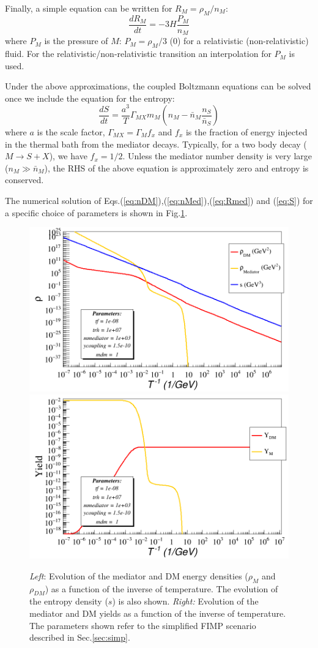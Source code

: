 \documentclass{article}
\def\to{\rightarrow}
\def\be{\begin{equation}}
\def\ee{\end{equation}}
\def\to{\rightarrow}
\newcommand\Drv[2]{\frac{d #1}{d #2}}
\begin{document}
Finally, a simple equation can be written for $R_M = \rho_M/n_M$:
\be
\Drv{R_M}{t} = -3 H \frac{P_M}{n_M} \label{eq:Rmed}
\ee
where $P_M$ is the pressure of $M$: $P_M = \rho_M/3$ ($0$) for a relativistic (non-relativistic) fluid.
For the relativistic/non-relativistic transition an interpolation for $P_M$ is
used.

Under the above approximations, the coupled Boltzmann equations can be solved once we include
the equation for the entropy:
\be
\Drv{S}{t} = \frac{a^3}{T} \Gamma_{MX} m_M \left(n_M -\bar{n}_M \frac{n_S}{\bar{n}_S}\right) \label{eq:S}
\ee
where $a$ is the scale factor, $\Gamma_{MX} = \Gamma_M f_x$ and $f_x$ is the fraction
of energy injected in the thermal bath from the mediator decays. Typically,
for a two body decay ($M \to S + X$), we have $f_x = 1/2$.
Unless the mediator number density is very large ($n_M \gg \bar{n}_M$), the RHS of the above equation is approximately
zero and entropy is conserved.

The numerical solution of Eqs.(\ref{eq:nDM}),(\ref{eq:nMed}),(\ref{eq:Rmed}) and (\ref{eq:S})
for a specific choice of parameters is shown in Fig.\ref{fig:solution1}.

\begin{figure}
\includegraphics[width=0.5\linewidth,clip]{test.png}
\includegraphics[width=0.5\linewidth,clip]{yield.png}
\caption{{\it Left}: Evolution of the mediator and DM energy densities ($\rho_M$ and $\rho_{DM}$)
as a function of the inverse of temperature. The evolution of the entropy density ($s$) is also shown.
{\it Right:} Evolution of the mediator and DM yields as a function of the inverse of temperature.
The parameters shown refer to the simplified FIMP scenario described in Sec.\ref{sec:simp}.
 \label{fig:solution1}}
\end{figure}
\end{document}
